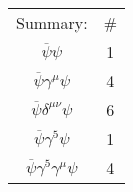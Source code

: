 \begin{table}[htpb]
  \centering
  \caption{}
  \label{tab:15-1}
  \begin{tabular}{c  c}
    Summary: & #\\
    $\overline{\psi}\psi$ & 1 \\
    $\overline{\psi} \gamma^{\mu} \psi$ & 4 \\
    $\overline{\psi} \delta^{\mu\nu} \psi$ & 6 \\
    $\overline{\psi} \gamma^5\psi$ & 1 \\
    $\overline{\psi}\gamma^5 \gamma^{\mu} \psi$ & 4 \\
  \end{tabular}
\end{table}
